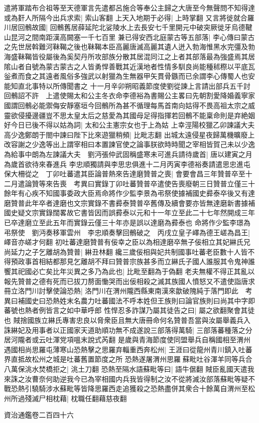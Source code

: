 遣將軍踏布合祖等至天德軍言先遣都呂施合等奉公主歸之大唐至今無聲問不知得達或為姧人所隔今出兵求索|{
	索山客翻}
上天入地期于必得|{
	上時掌翻}
又言將徙就合羅川居回鶻故國|{
	回鶻舊居薛延陀北娑陵水上去長安七千里開元中破突厥徙牙烏德鞬山昆河之間南距漢高闕塞一千七百里}
兼已得安西北庭蒙古等五部落|{
	李心傳曰蒙古之先世居斡難河靺鞨之後也靺鞨本臣高麗唐滅高麗其遺人迸入勃海惟黑水完彊及勃海盛靺鞨皆役屬後為奚契丹所攻部族分散其居混同江之上者其部落最為強盛焉其居隂山者自號為蒙古蒙古之人皆勇悍善戰其近漢地者性情多馴良尚能種秫穄以平底瓦釡煮而食之其遠者風俗多強武以射獵為生無器甲矢貫骨鏃而已余謂李心傳蜀人也安能知直北事特以所傳聞書之}
十一月辛卯朔昭義節度使劉從諫上言請出部兵五千討回鶻詔不許　上遣使賜太和公主冬衣命李德裕為書賜公主畧曰先朝割愛降婚義寧家國謂回鶻必能禦侮安靜塞垣今回鶻所為甚不循理每馬首南向姑得不畏高祖太宗之威靈欲侵擾邊疆豈不思太皇太后之慈愛為其國母足得指揮若回鶻不能稟命則是弃絶姻好今日已後不得以姑為詞|{
	太和公主憲宗女也于上為姑}
上幸涇陽校獵乙卯諫議大夫高少逸鄭朗于閤中諫曰陛下比來遊獵稍頻|{
	比毗志翻}
出城太遠侵星夜歸萬機曠廢上改容謝之少逸等出上謂宰相曰本置諫官使之論事朕欲時時聞之宰相皆賀己未以少逸為給事中朗為左諫議大夫　劉沔張仲武固稱盛寒未可進兵請待歲首|{
	唐以建寅之月為歲首欲待來春進兵}
李忠順獨請與李思忠俱進十二月丙寅李德裕奏請遣思忠進屯保大柵從之　丁卯吐蕃遣其臣論普熱來告達磨贊普之喪|{
	會要會昌三年贊普卒至十二月遣論贊等來告喪　考異曰實錄丁卯吐蕃贊普卒遣使告喪廢朝三日贊普立僅三十餘年有心疾不知國事委政大臣焉命將作少監李景為弔祭使據補國史彛泰卒後又有達磨贊普此年卒者達磨也文宗實錄不書彛泰贊普卒舊傳及續會要亦皆無達磨新書據補國史疑文宗實錄闊畧故它書皆因而誤彛泰以元和十一年立至此二十七年然開成三年已卒達磨立至此五年而實錄云僅三十年亦是誤以達磨為彛泰也}
命將作少監李璟為弔祭使　劉沔奏移軍雲州　李忠順奏擊回鶻破之　丙戌立皇子嶧為德王嵯為昌王|{
	嶧音亦嵯才何翻}
初吐蕃達磨贊普有佞幸之臣以為相達磨卒無子佞相立其妃綝氏兄尚延力之子乞離胡為贊普|{
	綝丑林翻}
纔三歲佞相與妃共制國事吐蕃老臣數十人皆不得預政事首相結都那見乞離胡不拜曰贊普宗族甚多而立綝氏子國人誰服其令鬼神誰饗其祀國必亡矣比年災異之多乃為此也|{
	比毗至翻為于偽翻}
老夫無權不得正其亂以報先贊普之德有死而已拔刀剺面慟哭而出佞相殺之滅其族國人憤怒又不遣使詣唐求冊立洛門川討擊使論恐熱|{
	洛門川在渭州隴西縣東南漢來歙破隗純于落門即此　考異曰補國史曰恐熱姓末名農力吐蕃國法不呼本姓但王族則曰論官族則曰尚其中字即蕃號也熱者例皆言之如中華呼郎}
性悍忍多詐謀乃屬其徒告之曰|{
	屬之欲翻聚會其徒也}
賊捨國族立綝氏專害忠良以脅衆臣且無大唐冊命何名贊普吾當與汝屬舉義兵入誅綝妃及用事者以正國家天道助順功無不成遂說三部落得萬騎|{
	三部落蕃種落之分居河隴者或云吐渾党項嗢末說式芮翻}
是歲與青海節度使同盟舉兵自稱國相至渭州遇國相尚思羅屯薄寒山恐熱擊之思羅弃輜重西奔松州|{
	王涯曰從龍州青川鎮入吐蕃界直抵故松州之城是吐蕃舊置節度之所}
恐熱遂屠渭州思羅蘇毗吐谷渾羊同等兵合八萬保洮水焚橋拒之|{
	洮土刀翻}
恐熱至隔水語蘇毗等曰|{
	語牛倨翻}
賊臣亂國天遣我來誅之汝曹奈何助逆我今已為宰相國内兵我皆得制之汝不從將滅汝部落蘇毗等疑不戰恐熱引驍騎涉水蘇毗等皆降思羅西走追獲殺之恐熱盡併其衆合十餘萬自渭州至松州所過殘滅尸相枕藉|{
	枕職任翻藉慈夜翻}


資治通鑑卷二百四十六
